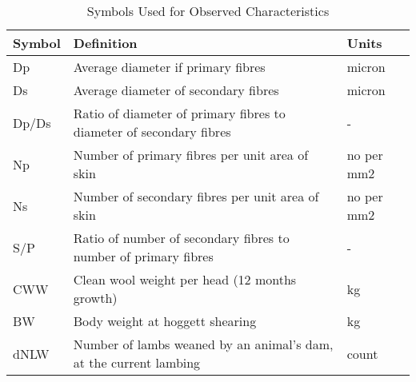 %

\begin{table}[h]
\centering
\caption{Symbols Used for Observed Characteristics}
\label{tb:1}
\vspace{0.1in}
\begin{tabular}{l|l|l}  \hline
  Symbol &  Definition &  Units \\ \hline
  Dp   & Average diameter if primary fibres     & micron \\
  Ds   & Average diameter of secondary fibres   & micron \\
  Dp/Ds &          Ratio of diameter of primary fibres to diameter of secondary fibres &   - \\
  Np   & Number of primary fibres per unit area of skin    & no per mm2 \\
  Ns   & Number of secondary fibres per unit area of skin  & no per mm2 \\
  S/P  & Ratio of number of secondary fibres to number of primary fibres  &    - \\
  CWW  & Clean wool weight per head (12 months growth) & kg \\
  BW   & Body weight at hoggett shearing               & kg \\
  dNLW & Number of lambs weaned by an animal's dam, at the current lambing & count \\ \hline
\end{tabular}
\end{table}

%

